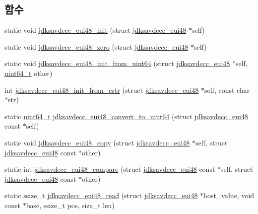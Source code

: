 \subsection*{함수}
\begin{DoxyCompactItemize}
\item 
static void \hyperlink{group__eui48_gae0bd9d7b819e8314b425d7c8bbae2333}{jdksavdecc\+\_\+eui48\+\_\+init} (struct \hyperlink{structjdksavdecc__eui48}{jdksavdecc\+\_\+eui48} $\ast$self)
\item 
static void \hyperlink{group__eui48_ga442d51d426fa9ba3fc3ffa24fbfbd115}{jdksavdecc\+\_\+eui48\+\_\+zero} (struct \hyperlink{structjdksavdecc__eui48}{jdksavdecc\+\_\+eui48} $\ast$self)
\item 
static void \hyperlink{group__eui48_ga2ad6a2134cf05279fa3f4ac8a45aa372}{jdksavdecc\+\_\+eui48\+\_\+init\+\_\+from\+\_\+uint64} (struct \hyperlink{structjdksavdecc__eui48}{jdksavdecc\+\_\+eui48} $\ast$self, \hyperlink{parse_8c_aec6fcb673ff035718c238c8c9d544c47}{uint64\+\_\+t} other)
\item 
int \hyperlink{group__eui48_ga55b46df59ed49eb9a301e716f601d632}{jdksavdecc\+\_\+eui48\+\_\+init\+\_\+from\+\_\+cstr} (struct \hyperlink{structjdksavdecc__eui48}{jdksavdecc\+\_\+eui48} $\ast$self, const char $\ast$str)
\item 
static \hyperlink{parse_8c_aec6fcb673ff035718c238c8c9d544c47}{uint64\+\_\+t} \hyperlink{group__eui48_ga78571c7205584f7ebeee362eb97d57eb}{jdksavdecc\+\_\+eui48\+\_\+convert\+\_\+to\+\_\+uint64} (struct \hyperlink{structjdksavdecc__eui48}{jdksavdecc\+\_\+eui48} const $\ast$self)
\item 
static void \hyperlink{group__eui48_ga82569cf9462378d6b028380d49da5b3a}{jdksavdecc\+\_\+eui48\+\_\+copy} (struct \hyperlink{structjdksavdecc__eui48}{jdksavdecc\+\_\+eui48} $\ast$self, struct \hyperlink{structjdksavdecc__eui48}{jdksavdecc\+\_\+eui48} const $\ast$other)
\item 
static int \hyperlink{group__eui48_ga7c371a1a340b7fbb811ff3df423a761e}{jdksavdecc\+\_\+eui48\+\_\+compare} (struct \hyperlink{structjdksavdecc__eui48}{jdksavdecc\+\_\+eui48} const $\ast$self, struct \hyperlink{structjdksavdecc__eui48}{jdksavdecc\+\_\+eui48} const $\ast$other)
\item 
static ssize\+\_\+t \hyperlink{group__eui48_ga43bea2dbbbf14abff89abb8afa66db98}{jdksavdecc\+\_\+eui48\+\_\+read} (struct \hyperlink{structjdksavdecc__eui48}{jdksavdecc\+\_\+eui48} $\ast$host\+\_\+value, void const $\ast$base, ssize\+\_\+t pos, size\+\_\+t len)
\item 

\end{DoxyCompactItemize}
